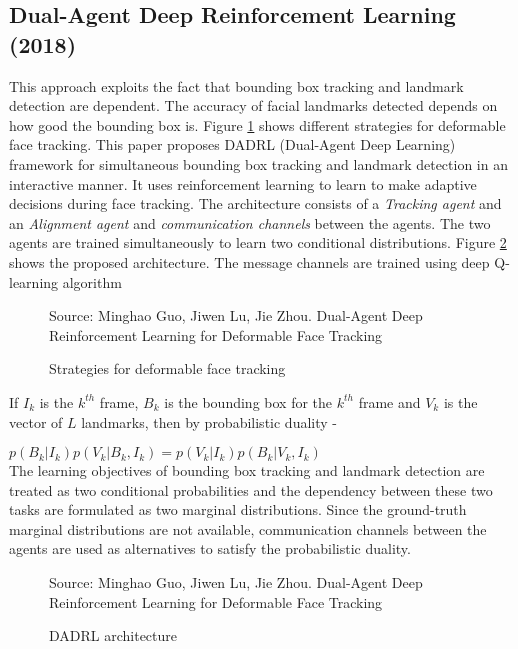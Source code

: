 \documentclass{llncs}
\begin{document}
\subsection{Dual-Agent Deep Reinforcement Learning (2018) \cite{dadrl}}

This approach exploits the fact that bounding box tracking and landmark detection are dependent. The accuracy of facial landmarks detected depends on how good the bounding box is.
Figure \ref{deformable_face_tracking} shows different strategies for deformable face tracking. This paper proposes DADRL (Dual-Agent Deep Learning) framework for simultaneous bounding box tracking and landmark detection in an interactive manner. It uses reinforcement learning to learn to make adaptive decisions during face tracking. The architecture consists of a \textit{Tracking agent} and an \textit{Alignment agent} and \textit{communication channels} between the agents. The two agents are trained simultaneously to learn two conditional distributions. Figure \ref{dadrl_architecture} shows the proposed architecture. The message channels are trained using deep Q-learning algorithm\\

\begin{figure}
%
{Source: Minghao Guo, Jiwen Lu, Jie Zhou. Dual-Agent Deep Reinforcement Learning for Deformable Face Tracking}
\caption{Strategies for deformable face tracking}
\label{deformable_face_tracking}
\end{figure}

If $I_k$ is the $k^{th}$ frame, $B_k$ is the bounding box for the $k^{th}$ frame and $V_k$ is the vector of $L$ landmarks, then by probabilistic duality -  

$p\left(B_{k} | I_{k}\right) p\left(V_{k} | B_{k}, I_{k}\right)=p\left(V_{k} | I_{k}\right) p\left(B_{k} | V_{k}, I_{k}\right)$\\

The learning objectives of bounding box tracking and landmark detection are treated as two conditional probabilities and the dependency between these two tasks are formulated as two marginal distributions. Since the ground-truth marginal distributions are not available, communication channels between the agents are used as alternatives to satisfy the probabilistic duality.





\begin{figure}
%
{Source: Minghao Guo, Jiwen Lu, Jie Zhou. Dual-Agent Deep Reinforcement Learning for Deformable Face Tracking}
\caption{DADRL architecture}
\label{dadrl_architecture}
\end{figure}
\end{document}
